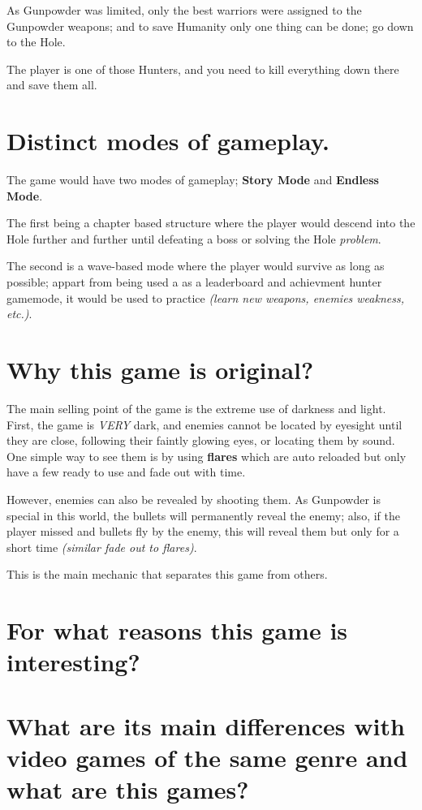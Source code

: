\documentclass[12pt]{article}
\begin{document}
As Gunpowder was limited, only the best warriors were assigned to the Gunpowder weapons; and to save Humanity only one thing can be done; go down to the Hole.

The player is one of those Hunters, and you need to kill everything down there and save them all.

\newpage


\section{Distinct modes of gameplay.}
The game would have two modes of gameplay; \textbf{Story Mode} and \textbf{Endless Mode}.

The first being a chapter based structure where the player would descend into the Hole further and further until defeating a boss or solving the Hole \textit{problem}.

The second is a wave-based mode where the player would survive as long as possible; appart from being used a as a leaderboard and achievment hunter gamemode, it would be used to practice \textit{(learn new weapons, enemies weakness, etc.)}.


\section{Why this game is original?}
The main selling point of the game is the extreme use of darkness and light. First, the game is \textit{VERY} dark, and enemies cannot be located by eyesight until they are close, following their faintly glowing eyes, or locating them by sound. One simple way to see them is by using \textbf{flares} which are auto reloaded but only have a few ready to use and fade out with time.

However, enemies can also be revealed by shooting them. As Gunpowder is special in this world, the bullets will permanently reveal the enemy; also, if the player missed and bullets fly by the enemy, this will reveal them but only for a short time \textit{(similar fade out to flares)}.

This is the main mechanic that separates this game from others.


\section{For what reasons this game is interesting?}


\section{What are its main differences with video games of the same genre and what are this games?}
\end{document}
